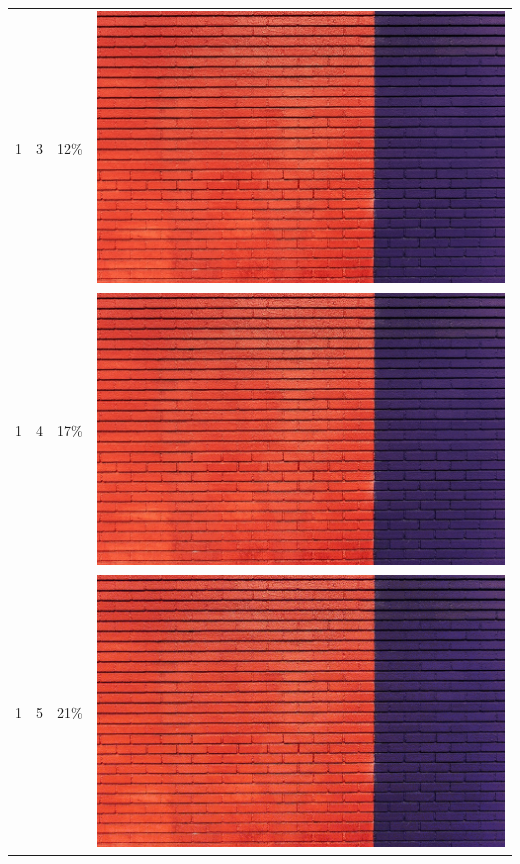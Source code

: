 \documentclass[times, utf8, seminar]{fer}
\begin{document}
\begin{center}
\begin{longtable}{|c|c|c|c|}
1 & 3 &12\% & \includegraphics[scale=0.3]{../benchmark_results/pattern/1_components-3_bits.png} \\
1 & 4 &17\% & \includegraphics[scale=0.3]{../benchmark_results/pattern/1_components-4_bits.png} \\
1 & 5 &21\% & \includegraphics[scale=0.3]{../benchmark_results/pattern/1_components-5_bits.png} \\

\end{longtable}
\end{center}
\end{document}
